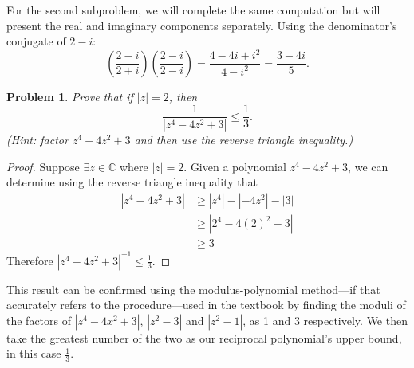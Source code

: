 \documentclass[12pt]{article}
\newtheorem{problem}{Problem}
\theoremstyle{remark}  %
\begin{document}
     For the second subproblem, we will complete the same computation but will present the real and imaginary components separately. Using the denominator's conjugate of $2-i$: $$ \left(\frac{2-i}{2+i}\right)\left(\frac{2-i}{2-i}\right) = \frac{4-4i+i^2}{4 - i^2} = \frac{3-4i}{5}. $$ 
\vspace{.5em}
    \begin{problem}
        Prove that if $|z|=2$, then $$\frac{1}{|z^4-4z^2+3|}\leq\frac{1}{3}.$$ (Hint: factor $z^4-4z^2+3$ and then use the reverse triangle inequality.)
    \end{problem}
    \begin{proof}
        Suppose $\exists z\in\mathbb{C}$ where $|z|=2$. Given a polynomial $z^4-4z^2+3$, we can determine using the reverse triangle inequality that
        \begin{align*}
            |z^4-4z^2+3| &\geq |z^4|-|-4z^2|-|3| \\
                         &\geq |2^4-4(2)^2-3| \\
                         &\geq 3
        \end{align*}
        Therefore $|z^4-4z^2+3|^{-1}\leq\frac{1}{3}$.
    \end{proof}
    This result can be confirmed using the modulus-polynomial method---if that accurately refers to the procedure---used in the textbook by finding the moduli of the factors of $|z^4-4x^2+3|$, $|z^2-3|$ and $|z^2-1|$, as 1 and 3 respectively. We then take the greatest number of the two as our reciprocal polynomial's upper bound, in this case $\frac{1}{3}$.
\end{document}
